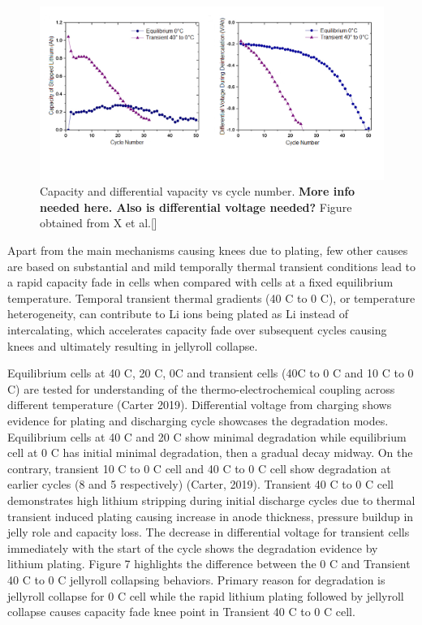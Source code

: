 \documentclass[journal=jpcl, manuscript=article, layout=onecolumn]{achemso}
\begin{document}
\begin{figure}[ht]
\centering
\includegraphics[scale = 1]{images/Capacity & Diff Voltage.png}
\caption{Capacity and differential vapacity vs cycle number.
\textbf{More info needed here.
Also is differential voltage needed?}
Figure obtained from X et al.[]
}
\label{fig:CapDiffCapCycle}
\end{figure}

Apart from the main mechanisms causing knees due to plating, few other causes are based on substantial and mild temporally thermal transient conditions lead to a rapid capacity fade in cells when compared with cells at a fixed equilibrium temperature. Temporal transient thermal gradients (40 \degree C to 0 \degree C), or temperature heterogeneity, can contribute to Li ions being plated as Li instead of intercalating, which accelerates capacity fade over subsequent cycles causing knees and ultimately resulting in jellyroll collapse.

Equilibrium cells at 40 \degree C, 20 \degree C, 0\degree C and transient cells (40\degree C to 0 \degree C and 10 \degree C to 0 \degree C) are tested for understanding of the thermo-electrochemical coupling across different temperature (Carter 2019). Differential voltage from charging shows evidence for plating and discharging cycle showcases the degradation modes. Equilibrium cells at 40 \degree C and 20 \degree C show minimal degradation while equilibrium cell at 0 \degree C has initial minimal degradation, then a gradual decay midway. On the contrary, transient 10 \degree C to 0 \degree C cell and 40 \degree C to 0 \degree C cell show degradation at earlier cycles (8 and 5 respectively) (Carter, 2019). Transient 40 \degree C to 0 \degree C cell demonstrates high lithium stripping during initial discharge cycles due to thermal transient induced plating causing increase in anode thickness, pressure buildup in jelly role and capacity loss. The decrease in differential voltage for transient cells immediately with the start of the cycle shows the degradation evidence by lithium plating.  Figure 7 highlights the difference between the 0 \degree C and Transient 40 \degree C to 0 \degree C jellyroll collapsing behaviors. Primary reason for degradation is jellyroll collapse for 0 \degree C cell while the rapid lithium plating followed by jellyroll collapse causes capacity fade knee point in Transient 40 \degree C to 0 \degree C cell. 
\end{document}
